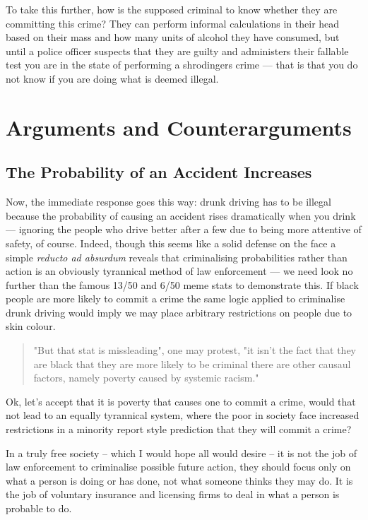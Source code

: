 \documentclass[11pt]{article}
\begin{document}
To take this further, how is the supposed criminal to know whether they are committing this crime? They can perform informal calculations in their head based on their mass and how many units of alcohol they have consumed, but until a police officer suspects that they are guilty and administers their fallable test you are in the state of performing a shrodingers crime --- that is that you do not know if you are doing what is deemed illegal.


\section{Arguments and Counterarguments}
\label{sec:orgd27b9f4}

\subsection{The Probability of an Accident Increases}
\label{sec:org4a40d34}

Now, the immediate response goes this way: drunk driving has to be illegal because the probability of causing an accident rises dramatically when you drink --- ignoring the people who drive better after a few due to being more attentive of safety, of course. Indeed, though this seems like a solid defense on the face a simple \emph{reducto ad absurdum} reveals that criminalising probabilities rather than action is an obviously tyrannical method of law enforcement --- we need look no further than the famous 13/50 and 6/50 meme stats to demonstrate this. If black people are more likely to commit a crime the same logic applied to criminalise drunk driving would imply we may place arbitrary restrictions on people due to skin colour.

\begin{quote}
"But that stat is missleading", one may protest, "it isn't the fact that they are black that they are more likely to be criminal there are other causaul factors, namely poverty caused by systemic racism."
\end{quote}

Ok, let's accept that it is poverty that causes one to commit a crime, would that not lead to an equally tyrannical system, where the poor in society face increased restrictions in a minority report style prediction that they will commit a crime?

In a truly free society -- which I would hope all would desire -- it is not the job of law enforcement to criminalise possible future action, they should focus only on what a person is doing or has done, not what someone thinks they may do. It is the job of voluntary insurance and licensing firms to deal in what a person is probable to do.
\end{document}
